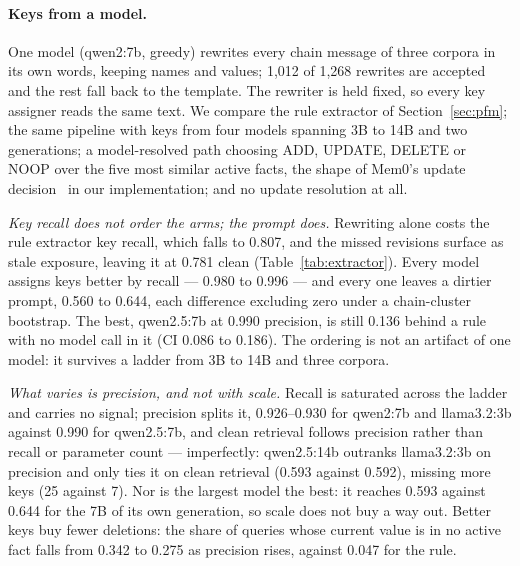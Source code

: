 \documentclass{article} %
\begin{document}
\paragraph{Keys from a model.}\label{sec:extractor}
One model (qwen2:7b, greedy) rewrites every chain message of three corpora in its own words, keeping names and values; 1{,}012 of 1{,}268 rewrites are accepted and the rest fall back to the template. The rewriter is held fixed, so every key assigner reads the same text. We compare the rule extractor of Section~\ref{sec:pfm}; the same pipeline with keys from four models spanning 3B to 14B and two generations; a model-resolved path choosing ADD, UPDATE, DELETE or NOOP over the five most similar active facts, the shape of Mem0's update decision~\citep{chhikara2025mem0} in our implementation; and no update resolution at all.

\emph{Key recall does not order the arms; the prompt does.} Rewriting alone costs the rule extractor key recall, which falls to 0.807, and the missed revisions surface as stale exposure, leaving it at 0.781 clean (Table~\ref{tab:extractor}). Every model assigns keys better by recall --- 0.980 to 0.996 --- and every one leaves a dirtier prompt, 0.560 to 0.644, each difference excluding zero under a chain-cluster bootstrap. The best, qwen2.5:7b at 0.990 precision, is still 0.136 behind a rule with no model call in it (CI 0.086 to 0.186). The ordering is not an artifact of one model: it survives a ladder from 3B to 14B and three corpora.

\emph{What varies is precision, and not with scale.} Recall is saturated across the ladder and carries no signal; precision splits it, 0.926--0.930 for qwen2:7b and llama3.2:3b against 0.990 for qwen2.5:7b, and clean retrieval follows precision rather than recall or parameter count --- imperfectly: qwen2.5:14b outranks llama3.2:3b on precision and only ties it on clean retrieval (0.593 against 0.592), missing more keys (25 against 7). Nor is the largest model the best: it reaches 0.593 against 0.644 for the 7B of its own generation, so scale does not buy a way out. Better keys buy fewer deletions: the share of queries whose current value is in no active fact falls from 0.342 to 0.275 as precision rises, against 0.047 for the rule.
\end{document}
